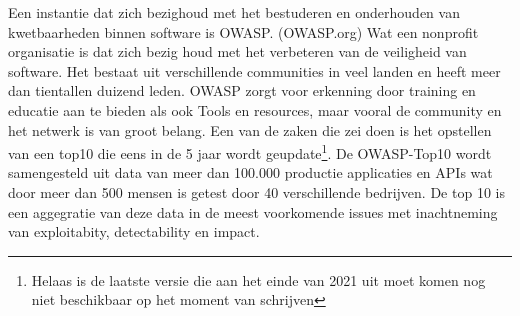 Een instantie dat zich bezighoud met het bestuderen en onderhouden van kwetbaarheden binnen software is OWASP. (OWASP.org) Wat een nonprofit organisatie is dat zich bezig houd met het verbeteren van de veiligheid van software. Het bestaat uit verschillende communities in veel landen en heeft meer dan tientallen duizend leden. OWASP zorgt voor erkenning door training en educatie aan te bieden als ook Tools en resources, maar vooral de community en het netwerk is van groot belang. Een van de zaken die zei doen is het opstellen van een top10 die eens in de 5 jaar wordt geupdate\footnote{Helaas is de laatste versie die aan het einde van 2021 uit moet komen nog niet beschikbaar op het moment van schrijven}. De OWASP-Top10 wordt samengesteld uit data van meer dan 100.000 productie applicaties en APIs wat door meer dan 500 mensen is getest door 40 verschillende bedrijven. De top 10 is een aggegratie van deze data in de meest voorkomende issues met inachtneming van exploitabity, detectability en impact.

